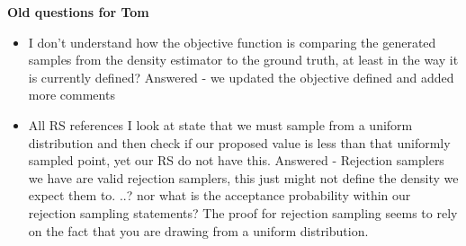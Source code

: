 \documentclass{article}
\begin{document}
\textbf{Old questions for Tom}
\begin{itemize}
  \item I don't understand how the objective function is comparing the generated samples from the density 
  estimator to the ground truth, at least in the way it is currently defined? Answered - we updated the objective defined and added more comments
  \item All RS references I look at state that we must sample from a uniform distribution and
  then check if our proposed value is less than that uniformly sampled point, yet our RS do not have this. Answered - Rejection samplers we have are valid rejection samplers, this just might not define the density we expect them to. ..?
  nor what is the acceptance probability within our rejection sampling statements? The proof for rejection sampling seems to rely on the fact that you are drawing from a uniform distribution.  


\end{itemize}
\end{document}
